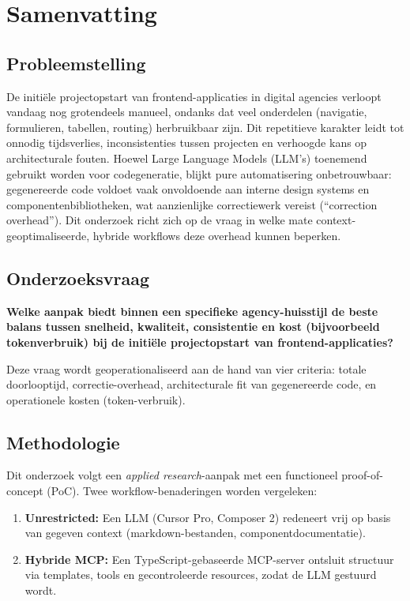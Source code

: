 
\chapter*{Samenvatting}

\section*{Probleemstelling}

De initiële projectopstart van frontend-applicaties in digital agencies verloopt vandaag nog grotendeels manueel, ondanks dat veel onderdelen (navigatie, formulieren, tabellen, routing) herbruikbaar zijn. Dit repetitieve karakter leidt tot onnodig tijdsverlies, inconsistenties tussen projecten en verhoogde kans op architecturale fouten. Hoewel Large Language Models (LLM's) toenemend gebruikt worden voor codegeneratie, blijkt pure automatisering onbetrouwbaar: gegenereerde code voldoet vaak onvoldoende aan interne design systems en componentenbibliotheken, wat aanzienlijke correctiewerk vereist (``correction overhead''). Dit onderzoek richt zich op de vraag in welke mate context-geoptimaliseerde, hybride workflows deze overhead kunnen beperken.

\section*{Onderzoeksvraag}

\textbf{Welke aanpak biedt binnen een specifieke agency-huisstijl de beste balans tussen snelheid, kwaliteit, consistentie en kost (bijvoorbeeld tokenverbruik) bij de initiële projectopstart van frontend-applicaties?}

Deze vraag wordt geoperationaliseerd aan de hand van vier criteria: totale doorlooptijd, correctie-overhead, architecturale fit van gegenereerde code, en operationele kosten (token-verbruik).

\section*{Methodologie}

Dit onderzoek volgt een \textit{applied research}-aanpak met een functioneel proof-of-concept (PoC). Twee workflow-benaderingen worden vergeleken:

\begin{enumerate}
  \item \textbf{Unrestricted:} Een LLM (Cursor Pro, Composer 2) redeneert vrij op basis van gegeven context (markdown-bestanden, componentdocumentatie).
  
  \item \textbf{Hybride MCP:} Een TypeScript-gebaseerde MCP-server ontsluit structuur via templates, tools en gecontroleerde resources, zodat de LLM gestuurd wordt.
\end{enumerate}

